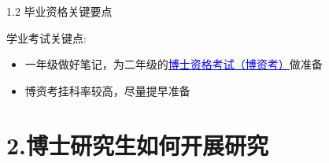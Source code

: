\documentclass[10pt,aspectratio=43,mathserif,table]{beamer}
\begin{document}
\begin{frame}{\small 1.2 毕业资格关键要点}
\begin{block}{\footnotesize 学业考试关键点:}
		\begin{itemize}
			\item \footnotesize 一年级做好笔记，为二年级的\href{https://yjsy.uibe.edu.cn/cms/infoSingleArticle.do?articleId=7172}{{\textcolor{blue}{\underline{博士资格考试（博资考）}}}}做准备
		\end{itemize}
		
		\begin{itemize}
			\item \footnotesize 博资考挂科率较高，尽量提早准备
		\end{itemize}
	\end{block}
\end{frame}




\section{2.博士研究生如何开展研究}  %
\end{document}
